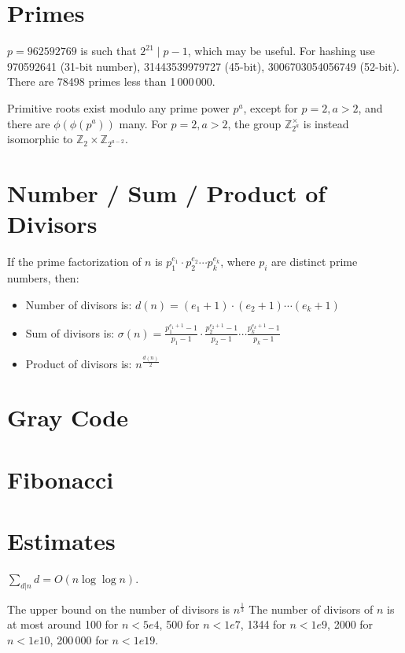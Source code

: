 \section{Primes}
$p=962592769$ is such that $2^{21} \mid p-1$, which may be useful. For hashing
use 970592641 (31-bit number), 31443539979727 (45-bit), 3006703054056749
(52-bit). There are 78498 primes less than 1\,000\,000.

Primitive roots exist modulo any prime power $p^a$, except for $p = 2, a > 2$,
and there are $\phi(\phi(p^a))$ many. For $p = 2, a > 2$, the group $\mathbb
   Z_{2^a}^\times$ is instead isomorphic to $\mathbb Z_2 \times \mathbb
   Z_{2^{a-2}}$.

\section{Number / Sum / Product of Divisors}
If the prime factorization of \( n \) is \( p_1^{e_1} \cdot p_2^{e_2} \cdots
p_k^{e_k} \), where \( p_i \) are distinct prime numbers, then:
\begin{itemize}
   \item Number of divisors is: $d(n) = (e_1 + 1) \cdot (e_2 + 1) \cdots (e_k + 1)$
   \item Sum of divisors is: $\sigma(n) = \frac{p_1^{e_1 + 1} - 1}{p_1 - 1} \cdot
            \frac{p_2^{e_2 + 1} - 1}{p_2 - 1} \cdots \frac{p_k^{e_k + 1} - 1}{p_k - 1}$
   \item Product of divisors is: $n^{\frac{d(n)}{2}}$
\end{itemize}

\section{Gray Code}

\section{Fibonacci}

\section{Estimates}
$\sum_{d|n} d = O(n \log \log n)$.

The upper bound on the number of divisors is $n^{\frac{1}{3}}$ The number of
divisors of $n$ is at most around 100 for $n < 5e4$, 500 for $n < 1e7$, 1344
for $n < 1e9$, 2000 for $n < 1e10$, 200\,000 for $n < 1e19$.

